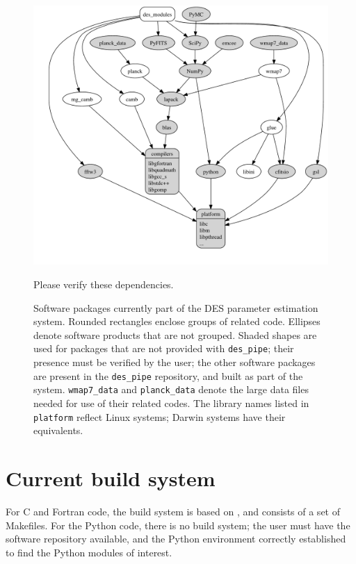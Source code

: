 \documentclass{memarticle}
\newcommand{\despipe}{\name{des-pipe}\xspace}
\begin{document}
\begin{figure}
  \centering
    \includegraphics[height=\textheight,width=\textwidth,keepaspectratio=true]{astro_packages}
    \caption{Software packages currently part of the DES parameter
    estimation system. Rounded rectangles enclose groups of related
    code. Ellipses denote software products that are not grouped.
    Shaded shapes are used for packages that are not provided with
    \texttt{des\_pipe}; their presence must be verified by the user;
    the other software packages are present in the \texttt{des\_pipe}
    repository, and built as part of the system. \texttt{wmap7\_data}
    and \texttt{planck\_data} denote the large data files needed for
    use of their related codes. The library names listed in
    \texttt{platform} reflect Linux systems; Darwin systems have their
    equivalents.} \label{fig:astropackages}
    \begin{fixme}
    Please verify these dependencies.
    \end{fixme}
\end{figure}

\section{Current build system}

For C and Fortran code, the \despipe build system is based on
, and consists of a set of Makefiles. For the Python code,
there is no build system; the user must have the software repository
available, and the Python environment correctly established to find the
Python modules of interest.
\end{document}
